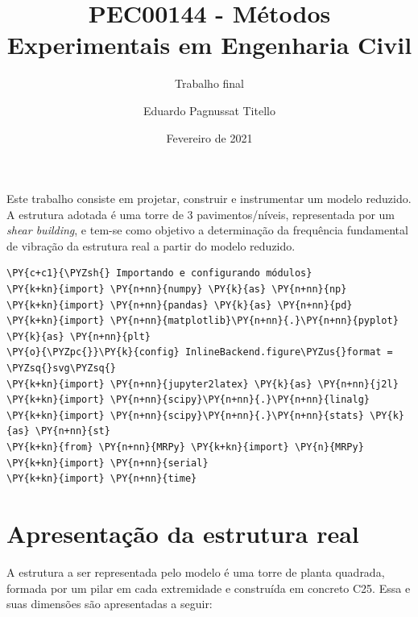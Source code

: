 

\author{Eduardo Pagnussat Titello}
\title{PEC00144 - Métodos Experimentais em Engenharia Civil}
\subtitle{Trabalho final}
\date{Fevereiro de 2021}



	
\maketitle

Este trabalho consiste em projetar, construir e instrumentar um modelo
reduzido. A estrutura adotada é uma torre de 3 pavimentos/níveis,
representada por um \emph{shear building}, e tem-se como objetivo a
determinação da frequência fundamental de vibração da estrutura real a
partir do modelo reduzido.

\tableofcontents

\pagebreak

    \begin{tcolorbox}[breakable, size=fbox, boxrule=1pt, pad at break*=1mm,colback=cellbackground, colframe=cellborder]
\begin{Verbatim}[commandchars=\\\{\}]
\PY{c+c1}{\PYZsh{} Importando e configurando módulos}
\PY{k+kn}{import} \PY{n+nn}{numpy} \PY{k}{as} \PY{n+nn}{np}
\PY{k+kn}{import} \PY{n+nn}{pandas} \PY{k}{as} \PY{n+nn}{pd} 
\PY{k+kn}{import} \PY{n+nn}{matplotlib}\PY{n+nn}{.}\PY{n+nn}{pyplot} \PY{k}{as} \PY{n+nn}{plt}
\PY{o}{\PYZpc{}}\PY{k}{config} InlineBackend.figure\PYZus{}format = \PYZsq{}svg\PYZsq{}
\PY{k+kn}{import} \PY{n+nn}{jupyter2latex} \PY{k}{as} \PY{n+nn}{j2l}
\PY{k+kn}{import} \PY{n+nn}{scipy}\PY{n+nn}{.}\PY{n+nn}{linalg}
\PY{k+kn}{import} \PY{n+nn}{scipy}\PY{n+nn}{.}\PY{n+nn}{stats} \PY{k}{as} \PY{n+nn}{st}
\PY{k+kn}{from} \PY{n+nn}{MRPy} \PY{k+kn}{import} \PY{n}{MRPy}
\PY{k+kn}{import} \PY{n+nn}{serial}
\PY{k+kn}{import} \PY{n+nn}{time}
\end{Verbatim}
\end{tcolorbox}

    \hypertarget{apresentauxe7uxe3o-da-estrutura-real}{%
\section{Apresentação da estrutura
real}\label{apresentauxe7uxe3o-da-estrutura-real}}

A estrutura a ser representada pelo modelo é uma torre de planta
quadrada, formada por um pilar em cada extremidade e construída em
concreto C25. Essa e suas dimensões são apresentadas a seguir:

